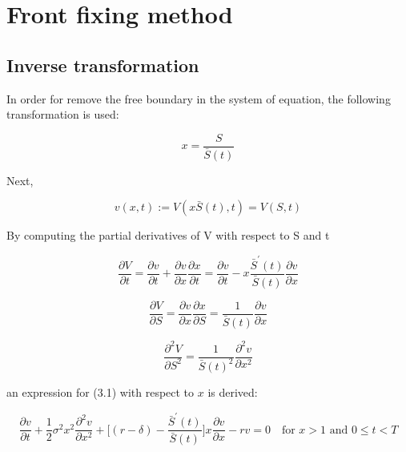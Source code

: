\section{Front fixing method}

\subsection{Inverse transformation}

In order for remove the free boundary in the system of equation, the following 
transformation is used:

\begin{equation}
    x = \frac{S}{\bar{S}(t)}
\end{equation}

Next,

\begin{equation}
    v(x, t) := V(x\bar{S}(t), t) = V(S, t)
\end{equation}


By computing the partial derivatives of V with respect to S and t

\begin{equation}
    \frac{\partial{V}}{\partial{t}} =  \frac{\partial{v}}{\partial{t}} + \frac{\partial{v}}{\partial{x}} \frac{\partial{x}}{\partial{t}} 
    = \frac{\partial{v}}{\partial{t}} - x\frac{\bar{S}^\prime(t)}{\bar{S}(t)}\frac{\partial{v}}{\partial{x}} 
\end{equation}

\begin{equation}
    \frac{\partial{V}}{\partial{S}} = \frac{\partial{v}}{\partial{x}} 
    \frac{\partial{x}}{\partial{S}} = 
    \frac{1}{\bar{S}(t)} \frac{\partial{v}}{\partial{x}}
\end{equation}

\begin{equation}
    \frac{\partial^2{V}}{\partial{S^2}} =
    \frac{1}{\bar{S}(t)^2} \frac{\partial^2{v}}{\partial{x}^2}
\end{equation}

an expression for (3.1) with respect to $x$ is derived:

\begin{equation}
    \frac{\partial{v}}{\partial{t}} + \frac{1}{2}\sigma^{2} x^2 \frac{\partial^2{v}}{\partial{x}^2} + \bigg[(r - \delta) - \frac{\bar{S}^\prime(t)}{\bar{S}(t)}\bigg]x\frac{\partial{v}}{\partial{x}} - rv = 0 \quad \text{for $x > 1$ and $0 \le t < T$}
\end{equation}

